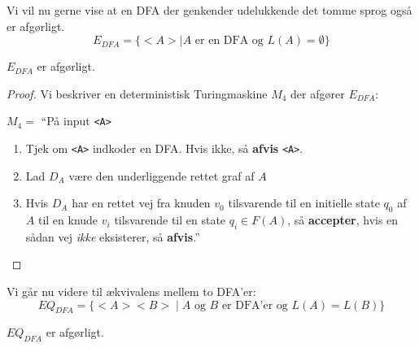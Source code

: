 Vi vil nu gerne vise at en DFA der genkender udelukkende det tomme sprog også er afgørligt.
\begin{equation*}
	E_{DFA} = \{<A> \mid A \text{ er en DFA og } L(A) = \emptyset\}
\end{equation*}

\begin{theorem}
	$E_{DFA}$ er afgørligt.
\end{theorem}

\begin{proof}
	Vi beskriver en deterministisk Turingmaskine $M_{4}$ der afgører $E_{DFA}$:

	$M_{4} = $ ``På input \texttt{<A>}
	\begin{enumerate}
		\item Tjek om \texttt{<A>} indkoder en DFA. Hvis ikke, så \textbf{afvis} \texttt{<A>}.
		\item Lad $D_{A}$ være den underliggende rettet graf af $A$
		\item Hvis $D_{A}$ har en rettet vej fra knuden $v_{0}$  tilsvarende til en initielle state $q_{0}$ af $A$ til en knude $v_{i}$ tilsvarende til en state $q_{i} \in F(A)$, så \textbf{accepter}, hvis en sådan vej \textit{ikke} eksisterer, så \textbf{afvis}.''
	\end{enumerate}
\end{proof}

Vi går nu videre til ækvivalens mellem to DFA'er:
\begin{equation*}
	EQ_{DFA} = \{{<A><B>} \mid A \text{ og } B \text{ er DFA'er og } L(A) = L(B)\}
\end{equation*}

\begin{theorem}
	$EQ_{DFA}$ er afgørligt.
\end{theorem}

